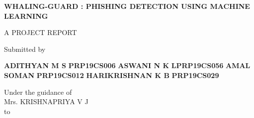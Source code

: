 

\begin{titlepage}
	\begin{center}
		\vspace{0.35cm}
		\vspace{0.5cm}
            \begin{spacing}{1.15}
            \textbf{\large{WHALING-GUARD : PHISHING DETECTION USING MACHINE LEARNING }} 
            \end{spacing}
		\vspace{0.9cm}
  
		\normalsize
     	\vspace{1.5cm}
     	A PROJECT REPORT 
		
		Submitted by\\
		\vspace{0.6cm}
		\begin{FlushLeft}
		\hspace{3.0cm}
		\textbf{{\selectfont ADITHYAN M S}}\hspace{1.68cm}
		\textbf{{\selectfont PRP19CS006}}\newline \vspace{0.1cm}
		\hspace{3.0cm}
		\textbf{{\selectfont ASWANI N K}}\hspace{2.3cm}
		\textbf{{\selectfont LPRP19CS056}}\newline
		\vspace{0.1cm}
		\hspace{3.0cm}
		\textbf{{\selectfont AMAL SOMAN}}\hspace{1.93cm}
		\textbf{{\selectfont PRP19CS012}}\newline
		\vspace{0.1cm}
		\hspace{3.0cm}
		\textbf{{\selectfont HARIKRISHNAN K B}}\hspace{0.51cm}
		\textbf{{\selectfont PRP19CS029}}
		\end{FlushLeft}
		\vspace{0.6cm}
		{\scriptsize Under the guidance of}\\
		Mrs. KRISHNAPRIYA V J\\
	        \vspace{0.3cm}
	         to\\
	         \vspace{0.8cm}

\end{center}
\end{titlepage}
